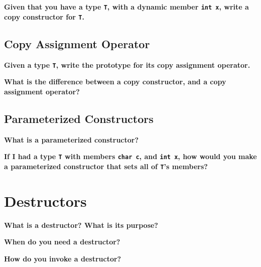 \documentclass[letterpaper, 12pt]{article}
\newcommand{\question}[2][4em]{\textbf{#2}\vspace{#1}\par}
\begin{document}
\question{Given that you have a type \texttt{T}, with a dynamic member
\texttt{int x}, write a copy constructor for \texttt{T}.}

\subsection{Copy Assignment Operator}
\question{Given a type \texttt{T}, write the prototype for its copy assignment
operator.}

\question{What is the difference between a copy constructor, and a copy
assignment operator?}

\subsection{Parameterized Constructors}
\question{What is a parameterized constructor?}

\question{If I had a type \texttt{T} with members \texttt{char c}, and
\texttt{int x}, how would you make a parameterized constructor that sets all of
\texttt{T}'s members?}

\pagebreak
\section{Destructors}
\question{What is a destructor? What is its purpose?}

\question{When do you need a destructor?}

\question{How do you invoke a destructor?}
\end{document}
